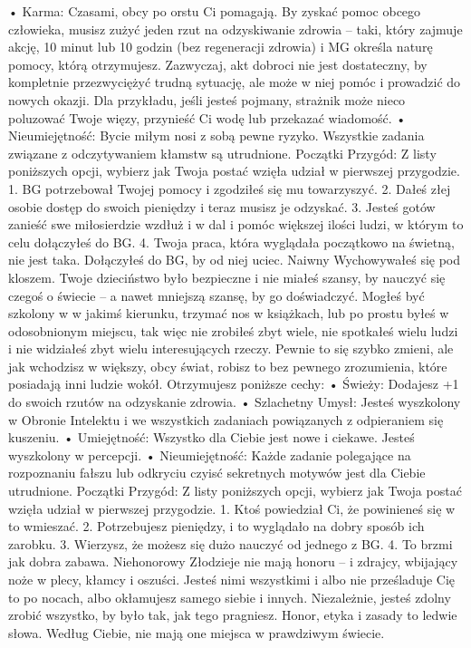     • Karma: Czasami, obcy po orstu Ci pomagają. By zyskać pomoc obcego człowieka, musisz zużyć jeden rzut na odzyskiwanie zdrowia – taki, który zajmuje akcję, 10 minut lub 10 godzin (bez regeneracji zdrowia) i MG określa naturę pomocy, którą otrzymujesz. Zazwyczaj, akt dobroci nie jest dostateczny, by kompletnie przezwyciężyć trudną sytuację, ale może w niej pomóc i prowadzić do nowych okazji. Dla przykładu, jeśli jesteś pojmany, strażnik może nieco poluzować Twoje więzy, przynieść Ci wodę lub przekazać wiadomość.
    • Nieumiejętność: Bycie miłym nosi z sobą pewne ryzyko. Wszystkie zadania związane z odczytywaniem kłamstw są utrudnione. 
Początki Przygód: Z listy poniższych opcji, wybierz jak Twoja postać wzięła udział w pierwszej przygodzie.
1. BG potrzebował Twojej pomocy i zgodziłeś się mu towarzyszyć.
2. Dałeś złej osobie dostęp do swoich pieniędzy i teraz musisz je odzyskać.
3. Jesteś gotów zanieść swe miłosierdzie wzdłuż i w dal i pomóc większej ilości ludzi, w którym to celu dołączyłeś do BG.
4. Twoja praca, która wyglądała początkowo na świetną, nie jest taka. Dołączyłeś do BG, by od niej uciec.
Naiwny
Wychowywałeś się pod kloszem. Twoje dzieciństwo było bezpieczne i nie miałeś szansy, by nauczyć się czegoś o świecie – a nawet mniejszą szansę, by go doświadczyć. Mogłeś być szkolony w w jakimś kierunku, trzymać nos w książkach, lub po prostu byłeś w odosobnionym miejscu, tak więc nie zrobiłeś zbyt wiele, nie spotkałeś wielu ludzi i nie widziałeś zbyt wielu interesujących rzeczy. Pewnie to się szybko zmieni, ale jak wchodzisz w większy, obcy świat, robisz to bez pewnego zrozumienia, które posiadają inni ludzie wokół. 
Otrzymujesz poniższe cechy:
    • Świeży: Dodajesz +1 do swoich rzutów na odzyskanie zdrowia.
    • Szlachetny Umysł: Jesteś wyszkolony w Obronie Intelektu i we wszystkich zadaniach powiązanych z odpieraniem się kuszeniu.
    • Umiejętność: Wszystko dla Ciebie jest nowe i ciekawe. Jesteś wyszkolony w percepcji.
    • Nieumiejętność: Każde zadanie polegające na rozpoznaniu fałszu lub odkryciu czyisć sekretnych motywów jest dla Ciebie utrudnione.
Początki Przygód: Z listy poniższych opcji, wybierz jak Twoja postać wzięła udział w pierwszej przygodzie.
1. Ktoś powiedział Ci, że powinieneś się w to wmieszać.
2. Potrzebujesz pieniędzy, i to wyglądało na dobry sposób ich zarobku.
3. Wierzysz, że możesz się dużo nauczyć od jednego z BG.
4. To brzmi jak dobra zabawa.
Niehonorowy
Złodzieje nie mają honoru – i zdrajcy, wbijający noże w plecy, kłamcy i oszuści. Jesteś nimi wszystkimi i albo nie prześladuje Cię to po nocach, albo okłamujesz samego siebie i innych. Niezależnie, jesteś zdolny zrobić wszystko, by było tak, jak tego pragniesz. Honor, etyka i zasady to ledwie słowa. Według Ciebie, nie mają one miejsca w prawdziwym świecie.

